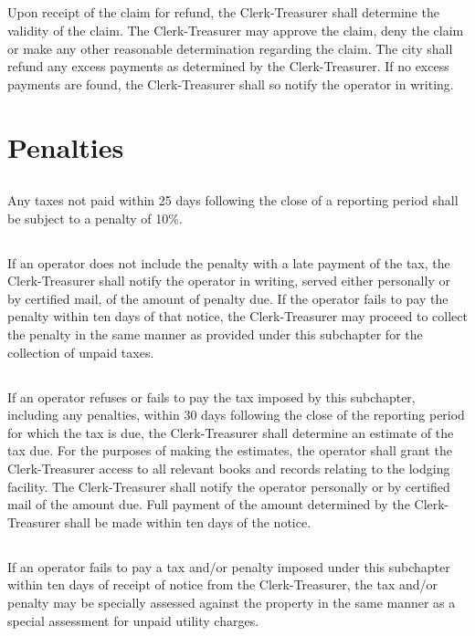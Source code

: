 \subsection{}
Upon receipt of the claim for refund, the Clerk-Treasurer shall determine the validity of the claim. The Clerk-Treasurer may approve the claim, deny the claim or make any other reasonable determination regarding the claim. The city shall refund any excess payments as determined by the Clerk-Treasurer. If no excess payments are found, the Clerk-Treasurer shall so notify the operator in writing.

\section{Penalties}
\subsection{}
Any taxes not paid within 25 days following the close of a reporting period shall be subject to a penalty of 10\%.
\subsection{}
If an operator does not include the penalty with a late payment of the tax, the Clerk-Treasurer shall notify the operator in writing, served either personally or by certified mail, of the amount of penalty due. If the operator fails to pay the penalty within ten days of that notice, the Clerk-Treasurer may proceed to collect the penalty in the same manner as provided under this subchapter for the collection of unpaid taxes.
\subsection{}
If an operator refuses or fails to pay the tax imposed by this subchapter, including any penalties, within 30 days following the close of the reporting period for which the tax is due, the Clerk-Treasurer shall determine an estimate of the tax due. For the purposes of making the estimates, the operator shall grant the Clerk-Treasurer access to all relevant books and records relating to the lodging facility. The Clerk-Treasurer shall notify the operator personally or by certified mail of the amount due. Full payment of the amount determined by the Clerk-Treasurer shall be made within ten days of the notice.
\subsection{}
If an operator fails to pay a tax and/or penalty imposed under this subchapter within ten days of receipt of notice from the Clerk-Treasurer, the tax and/or penalty may be specially assessed against the property in the same manner as a special assessment for unpaid utility charges.
